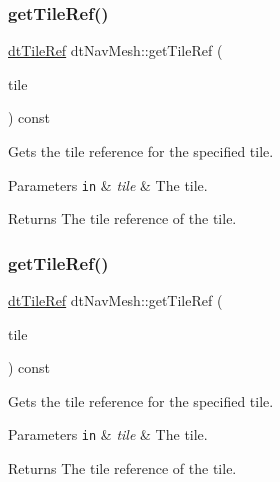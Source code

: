 \subsubsection{\texorpdfstring{get\+Tile\+Ref()}{getTileRef()}\hspace{0.1cm}{\footnotesize\ttfamily [1/2]}}
{\footnotesize\ttfamily \hyperlink{group__detour_ga7ea56cfe01bd7c34a81d821d94cbeea5}{dt\+Tile\+Ref} dt\+Nav\+Mesh\+::get\+Tile\+Ref (\begin{DoxyParamCaption}\item[{const \hyperlink{structdtMeshTile}{dt\+Mesh\+Tile} $\ast$}]{tile }\end{DoxyParamCaption}) const}

Gets the tile reference for the specified tile. 
\begin{DoxyParams}[1]{Parameters}
\mbox{\tt in}  & {\em tile} & The tile. \\
\hline
\end{DoxyParams}
\begin{DoxyReturn}{Returns}
The tile reference of the tile. 
\end{DoxyReturn}
\mbox{\label{classdtNavMesh_a6027a9a6f032dfd6a3b72563f17d80d7}} 
\subsubsection{\texorpdfstring{get\+Tile\+Ref()}{getTileRef()}\hspace{0.1cm}{\footnotesize\ttfamily [2/2]}}
{\footnotesize\ttfamily \hyperlink{group__detour_ga7ea56cfe01bd7c34a81d821d94cbeea5}{dt\+Tile\+Ref} dt\+Nav\+Mesh\+::get\+Tile\+Ref (\begin{DoxyParamCaption}\item[{const \hyperlink{structdtMeshTile}{dt\+Mesh\+Tile} $\ast$}]{tile }\end{DoxyParamCaption}) const}

Gets the tile reference for the specified tile. 
\begin{DoxyParams}[1]{Parameters}
\mbox{\tt in}  & {\em tile} & The tile. \\
\hline
\end{DoxyParams}
\begin{DoxyReturn}{Returns}
The tile reference of the tile. 
\end{DoxyReturn}
\mbox{\label{classdtNavMesh_a88f53f80fa95524b1e7197dface10948}} 
